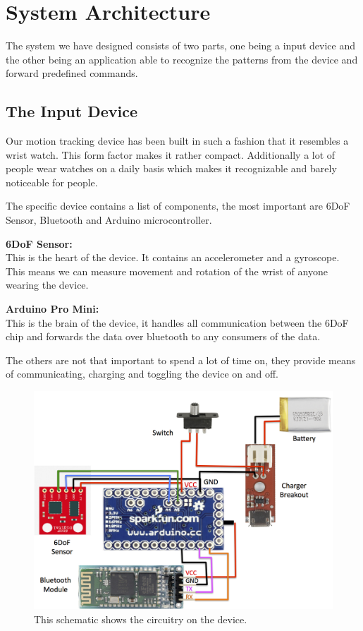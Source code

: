 \section{System Architecture}
The system we have designed consists of two parts,
one being a input device
and the other being an application able to recognize the patterns from the device and forward predefined commands.

\subsection{The Input Device}
Our motion tracking device has been built in such a fashion that it resembles a wrist watch.
This form factor makes it rather compact.
Additionally a lot of people wear watches on a daily basis which makes it recognizable and barely noticeable for people.

The specific device contains a list of components, the most important are 6DoF Sensor, Bluetooth and Arduino microcontroller.

\textbf{6DoF Sensor:}\\
This is the heart of the device. It contains an accelerometer and a gyroscope. This means we can measure movement and rotation of the wrist of anyone wearing the device.

\textbf{Arduino Pro Mini:}\\
This is the brain of the device, it handles all communication between the 6DoF chip and forwards the data over bluetooth to any consumers of the data.

The others are not that important to spend a lot of time on, they provide means of communicating, charging and toggling the device on and off.

\begin{figure}[!h]
\centering
\includegraphics[width=0.9\columnwidth]{img/device_schematic}
\caption{This schematic shows the circuitry on the device.}
\label{fig:figure1}
\end{figure}

